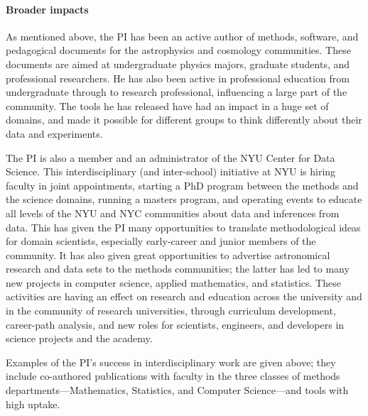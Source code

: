 \documentclass[12pt]{article}
\begin{document}
\paragraph{Broader impacts}

As mentioned above, the PI has been an active author of methods,
software, and pedagogical documents for the astrophysics and cosmology
communities.
These documents are aimed at undergraduate physics majors, graduate
students, and professional researchers.
He has also been active in professional education from undergraduate
through to research professional, influencing a large part of the
community.
The tools he has released have had an impact in a huge set of domains,
and made it possible for different groups to think differently about
their data and experiments.

The PI is also a member and an administrator of the NYU Center for
Data Science.
This interdisciplinary (and inter-school) initiative at NYU is hiring
faculty in joint appointments, starting a PhD program between the
methods and the science domains, running a masters program, and
operating events to educate all levels of the NYU and NYC communities
about data and inferences from data.
This has given the PI many opportunities to translate methodological
ideas for domain scientists, especially early-career and junior
members of the community.
It has also given great opportunities to advertise astronomical
research and data sets to the methods communities; the latter has led
to many new projects in computer science, applied mathematics, and
statistics.
These activities are having an effect on research and education across
the university and in the community of research universities, through
curriculum development, career-path analysis, and new roles for
scientists, engineers, and developers in science projects and the
academy.

Examples of the PI's success in interdisciplinary work are given
above; they include co-authored publications with faculty in the three
classes of methods departments---Mathematics, Statistics, and Computer
Science---and tools with high uptake.
\end{document}
